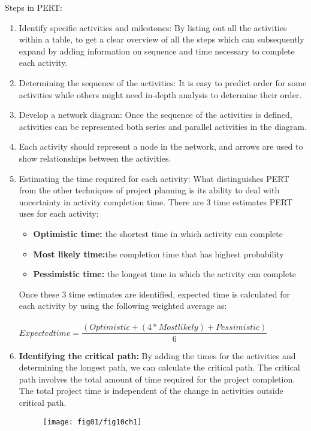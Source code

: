 Steps in PERT:

\begin{enumerate}
	\item Identify specific activities and milestones: By listing out all the activities within a table, to get a clear overview of all the steps which can subsequently expand by adding information on sequence and time necessary to complete each activity.
	
	\item Determining the sequence of the activities: It is easy to predict order for some activities while others might need in-depth analysis to determine their order.
	\item Develop a network diagram: Once the sequence of the activities is defined, activities can be represented both series and parallel activities in the diagram.
	\item Each activity should represent a node in the network, and arrows are used to show relationships between the activities.
	\item Estimating the time required for each activity: What distinguishes PERT from the other techniques of project planning is its ability to deal with uncertainty in activity completion time. There are 3 time estimates PERT uses for each activity:
	\begin{itemize}
		\item \textbf{Optimistic time:} the shortest time in which activity can complete 
		\item \textbf{Most likely time:}the completion time that has highest probability 
		\item \textbf{Pessimistic  time:} the longest time in which the activity can complete 
	\end{itemize}
Once these 3 time estimates are identified, expected time is calculated for each activity by using the following weighted average as:\\
\\
$Expected time = \dfrac{(Optimistic + (4* Most likely) + Pessimistic)}{6} $
		\item \textbf{Identifying the critical path:}  By adding the times for the activities and determining the longest path, we can calculate the critical path. The critical path involves the total amount of time required for the project completion. The total project time is independent of the change in activities outside critical path.
		
		
		\begin{figure}
			\centering
			\texttt{[image: fig01/fig10ch1]}
		\end{figure}
		
\end{enumerate}



